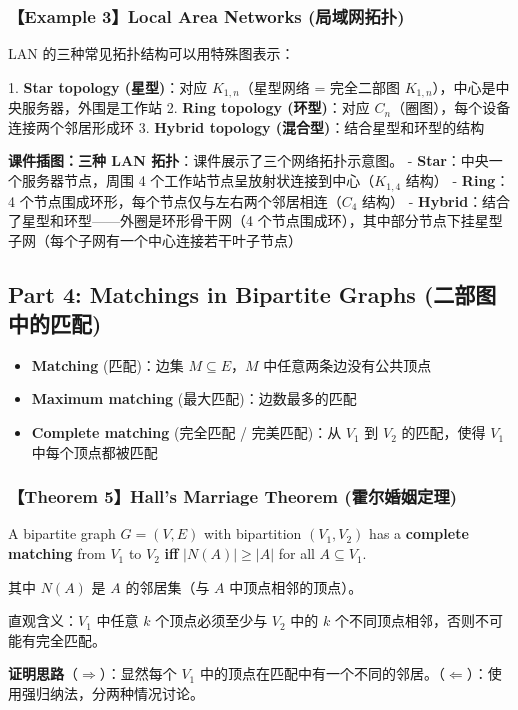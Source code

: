 \documentclass[10pt,a4paper,openany]{ctexbook}
\theoremstyle{definition}
\theoremstyle{remark}
\renewenvironment{quote}
  {\list{}{\leftmargin=1em\rightmargin=0pt\topsep=0.5pt\partopsep=0pt}\item[]}
  {\endlist}
\begin{document}
\vspace{-2pt}

\subsubsection{【Example 3】Local Area Networks (局域网拓扑)}

\begin{quote}
LAN 的三种常见拓扑结构可以用特殊图表示：

1. \textbf{Star topology (星型)}：对应 $K_{1,n}$（星型网络 = 完全二部图 $K_{1,n}$），中心是中央服务器，外围是工作站
2. \textbf{Ring topology (环型)}：对应 $C_n$（圈图），每个设备连接两个邻居形成环
3. \textbf{Hybrid topology (混合型)}：结合星型和环型的结构

\textbf{课件插图：三种 LAN 拓扑}：课件展示了三个网络拓扑示意图。
- \textbf{Star}：中央一个服务器节点，周围 4 个工作站节点呈放射状连接到中心（$K_{1,4}$ 结构）
- \textbf{Ring}：4 个节点围成环形，每个节点仅与左右两个邻居相连（$C_4$ 结构）
- \textbf{Hybrid}：结合了星型和环型——外圈是环形骨干网（4 个节点围成环），其中部分节点下挂星型子网（每个子网有一个中心连接若干叶子节点）

\end{quote}
\vspace{-2pt}

\subsection{Part 4: Matchings in Bipartite Graphs (二部图中的匹配)}

\begin{itemize}
\item \textbf{Matching} (匹配)：边集 $M \subseteq E$，$M$ 中任意两条边没有公共顶点
\item \textbf{Maximum matching} (最大匹配)：边数最多的匹配
\item \textbf{Complete matching} (完全匹配 / 完美匹配)：从 $V_1$ 到 $V_2$ 的匹配，使得 $V_1$ 中每个顶点都被匹配

\end{itemize}

\subsubsection{【Theorem 5】Hall's Marriage Theorem (霍尔婚姻定理)}

\begin{quote}
A bipartite graph $G = (V, E)$ with bipartition $(V_1, V_2)$ has a \textbf{complete matching} from $V_1$ to $V_2$ \textbf{iff} $|N(A)| \ge |A|$ for all $A \subseteq V_1$.

其中 $N(A)$ 是 $A$ 的邻居集（与 $A$ 中顶点相邻的顶点）。

直观含义：$V_1$ 中任意 $k$ 个顶点必须至少与 $V_2$ 中的 $k$ 个不同顶点相邻，否则不可能有完全匹配。

\textbf{证明思路}（$\Rightarrow$）：显然每个 $V_1$ 中的顶点在匹配中有一个不同的邻居。（$\Leftarrow$）：使用强归纳法，分两种情况讨论。

\end{quote}
\end{document}
